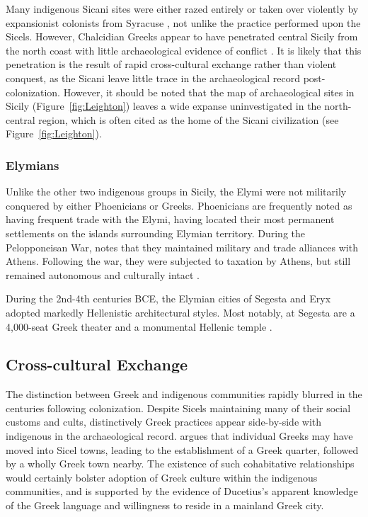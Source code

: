 \documentclass[american]{../../../coursework}
\begin{document}
Many indigenous Sicani sites were either razed entirely or taken over
violently by expansionist colonists from Syracuse \parencite{Boa80}, not
unlike the practice performed upon the Sicels. However, Chalcidian Greeks
appear to have penetrated central Sicily from the north coast with little
archaeological evidence of conflict \parencite{Sjo73}. It is likely that this
penetration is the result of rapid cross-cultural exchange rather than violent
conquest, as the Sicani leave little trace in the archaeological record
post-colonization. However, it should be noted that the map of archaeological
sites in Sicily (Figure~\ref{fig:Leighton}) leaves a wide expanse
uninvestigated in the north-central region, which is often cited as the home
of the Sicani civilization (see Figure~\ref{fig:Leighton}).

\subsubsection{Elymians}

Unlike the other two indigenous groups in Sicily, the Elymi were not
militarily conquered by either Phoenicians or Greeks. Phoenicians are
frequently noted as having frequent trade with the Elymi, having located their
most permanent settlements on the islands surrounding Elymian territory.
During the Pelopponeisan War, \citeauthor{Thucydides} notes that they
maintained military and trade alliances with Athens. Following the war, they
were subjected to taxation by Athens, but still remained autonomous and
culturally intact \parencite[VI.6]{Thucydides}.

During the 2nd-4th centuries BCE, the Elymian cities of Segesta and Eryx
adopted markedly Hellenistic architectural styles. Most notably, at Segesta
are a 4,000-seat Greek theater \parencite{Dan04} and a monumental Hellenic
temple \parencite{Bia84}.

\subsection{Cross-cultural Exchange}

The distinction between Greek and indigenous communities rapidly blurred in
the centuries following colonization. Despite Sicels maintaining many of their
social customs and cults, distinctively Greek practices appear side-by-side
with indigenous in the archaeological record. \textcite{Boa80} argues that
individual Greeks may have moved into Sicel towns, leading to the
establishment of a Greek quarter, followed by a wholly Greek town nearby. The
existence of such cohabitative relationships would certainly bolster adoption
of Greek culture within the indigenous communities, and is supported by the
evidence of Ducetius's apparent knowledge of the Greek language and
willingness to reside in a mainland Greek city.
\end{document}

